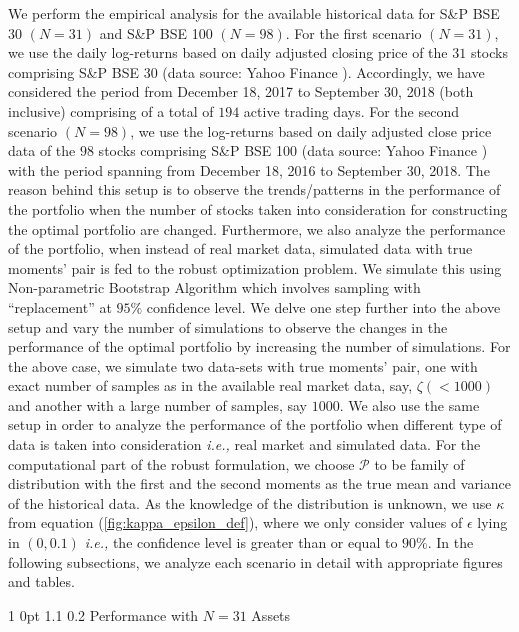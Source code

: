 \documentclass[12pt]{article}
\makeatletter
\numberwithin{equation}{section}
\renewcommand{\subsubsection}{
  \@startsection
  {subsubsection}%
  {1}%
  {0pt}%
  {1.1\baselineskip}%
  {0.2\baselineskip}%
  {\sc \centering}%
}
\makeatother
\begin{document}
We perform the empirical analysis for the available historical data for S\&P BSE 30 $(N=31)$ and S\&P BSE 100 $(N=98)$. For the first scenario $(N=31)$, we use the daily log-returns based on daily adjusted closing price of the $31$ stocks comprising S\&P BSE 30 (data source: Yahoo Finance \cite{Yf}). Accordingly, we have considered the period from December 18, 2017 to September 30, 2018 (both inclusive) comprising of a total of $194$ active trading days. For the second scenario $(N=98)$, we use the log-returns based on daily adjusted close price data of the $98$ stocks comprising S\&P BSE 100 (data source: Yahoo Finance \cite{Yf}) with the period spanning from December 18, 2016 to September 30, 2018. The reason behind this setup is to observe the trends/patterns in the performance of the portfolio when the number of stocks taken into consideration for constructing the optimal portfolio are changed. Furthermore, we also analyze the performance of the portfolio, when instead of real market data, simulated data with true moments' pair is fed to the robust optimization problem. We simulate this using Non-parametric Bootstrap Algorithm which involves sampling with ``replacement'' at $95\%$ confidence level. We delve one step further into the above setup and vary the number of simulations to observe the changes in the performance of the optimal portfolio by increasing the number of simulations. For the above case, we simulate two data-sets with true moments' pair, one with exact number of samples as in the available real market data, say, $\zeta(< 1000)$ and another with a large number of samples, say $1000$. We also use the same setup in order to analyze the performance of the portfolio when different type of data is taken into consideration \textit{i.e.,} real market and simulated data. For the computational part of the robust formulation, we choose $\mathcal{P}$ to be family of distribution with the first and the second moments as the true mean and variance of the historical data. As the knowledge of the distribution is unknown, we use $\kappa$ from equation (\ref{fig:kappa_epsilon_def}), where we only consider values of $\epsilon$ lying in $(0,0.1)$ \textit{i.e.,} the confidence level is greater than or equal to $90\%$. In the following subsections, we analyze each scenario in detail with appropriate figures and tables.

\subsubsection{Performance with $N=31$ Assets}
\end{document}
